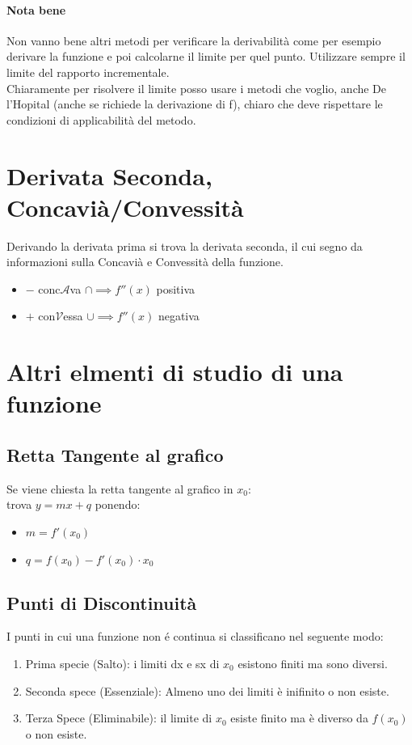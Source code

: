 \documentclass[12pt, a4paper, openany]{book}
\begin{document}
\paragraph*{Nota bene} Non vanno bene altri metodi per verificare la derivabilità come per esempio derivare la funzione
e poi calcolarne il limite per quel punto. Utilizzare sempre il limite del rapporto incrementale.\\
Chiaramente per risolvere il limite posso usare i metodi che voglio, anche De l'Hopital (anche se richiede la derivazione
di f), chiaro che deve rispettare le condizioni di applicabilità del metodo.

\section{Derivata Seconda, Concavià/Convessità}
Derivando la derivata prima si trova la derivata seconda, il cui segno da informazioni sulla Concavià e Convessità della funzione.
\begin{itemize}
	\item $-$ conc$\mathcal{A}$va $\cap \implies f''(x)$ positiva
	\item $+$ con$\mathcal{V}$essa $\cup \implies f''(x)$ negativa
\end{itemize}

\section{Altri elmenti di studio di una funzione}
\subsection{Retta Tangente al grafico}
Se viene chiesta la retta tangente al grafico in $x_0$:\\
trova $y=mx + q$ ponendo:
\begin{itemize}
	\item $m=f'(x_0)$
	\item $q=f(x_0)-f'(x_0)\cdot x_0$
\end{itemize}

\subsection{Punti di Discontinuità}
I punti in cui una funzione non é continua si classificano nel seguente modo:
\begin{enumerate}
	\item Prima specie (Salto): i limiti dx e sx di $x_0$ esistono finiti ma sono diversi.
	\item Seconda spece (Essenziale): Almeno uno dei limiti è inifinito o non esiste.
	\item Terza Spece (Eliminabile): il limite di $x_0$ esiste finito ma è diverso da $f(x_0)$ o non esiste.
\end{enumerate}
\end{document}
